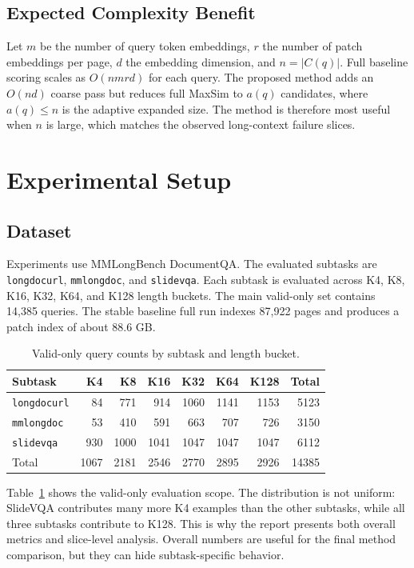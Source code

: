 \documentclass[11pt]{article}
\begin{document}
\subsection{Expected Complexity Benefit}

Let $m$ be the number of query token embeddings, $r$ the number of patch embeddings per page, $d$ the embedding dimension, and $n=|C(q)|$. Full baseline scoring scales as $O(nmrd)$ for each query. The proposed method adds an $O(nd)$ coarse pass but reduces full MaxSim to $a(q)$ candidates, where $a(q) \leq n$ is the adaptive expanded size. The method is therefore most useful when $n$ is large, which matches the observed long-context failure slices.

\section{Experimental Setup}

\subsection{Dataset}

Experiments use MMLongBench DocumentQA. The evaluated subtasks are \texttt{longdocurl}, \texttt{mmlongdoc}, and \texttt{slidevqa}. Each subtask is evaluated across K4, K8, K16, K32, K64, and K128 length buckets. The main valid-only set contains 14,385 queries. The stable baseline full run indexes 87,922 pages and produces a patch index of about 88.6 GB.

\begin{table}[t]
\centering
\small
\begin{tabular}{lrrrrrrr}
\toprule
Subtask & K4 & K8 & K16 & K32 & K64 & K128 & Total \\
\midrule
\texttt{longdocurl} & 84 & 771 & 914 & 1060 & 1141 & 1153 & 5123 \\
\texttt{mmlongdoc} & 53 & 410 & 591 & 663 & 707 & 726 & 3150 \\
\texttt{slidevqa} & 930 & 1000 & 1041 & 1047 & 1047 & 1047 & 6112 \\
\midrule
Total & 1067 & 2181 & 2546 & 2770 & 2895 & 2926 & 14385 \\
\bottomrule
\end{tabular}
\caption{Valid-only query counts by subtask and length bucket.}
\label{tab:scope}
\end{table}

Table~\ref{tab:scope} shows the valid-only evaluation scope. The distribution is not uniform: SlideVQA contributes many more K4 examples than the other subtasks, while all three subtasks contribute to K128. This is why the report presents both overall metrics and slice-level analysis. Overall numbers are useful for the final method comparison, but they can hide subtask-specific behavior.
\end{document}
